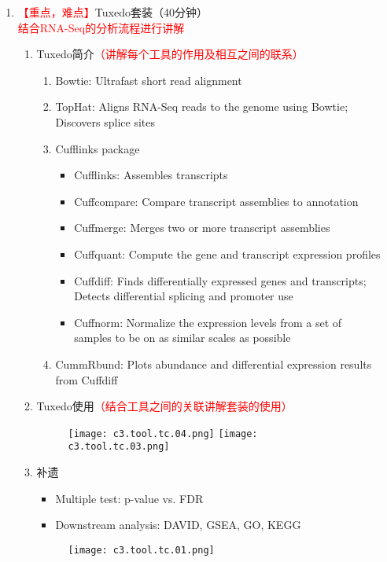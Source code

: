 \documentclass{TIJMUjiaoanLL}
\begin{document}
\begin{enumerate}
  \item \textcolor{red}{【重点，难点】}Tuxedo套装（40分钟）
    \\ \textcolor{red}{结合RNA-Seq的分析流程进行讲解}
    \begin{enumerate}
      \item Tuxedo简介\textcolor{red}{（讲解每个工具的作用及相互之间的联系）}
        \begin{enumerate}
          \item Bowtie: Ultrafast short read alignment
          \item TopHat: Aligns RNA-Seq reads to the genome using Bowtie; Discovers splice sites
          \item Cufflinks package
            \begin{itemize}
              \item Cufflinks: Assembles transcripts
              \item Cuffcompare: Compare transcript assemblies to annotation
              \item Cuffmerge: Merges two or more transcript assemblies
              \item Cuffquant: Compute the gene and transcript expression profiles
              \item Cuffdiff: Finds differentially expressed genes and transcripts;\\ Detects differential splicing and promoter use
              \item Cuffnorm: Normalize the expression levels from a set of\\ samples to be on as similar scales as possible
            \end{itemize}
          \item CummRbund: Plots abundance and differential expression results from Cuffdiff
        \end{enumerate}
      \item Tuxedo使用\textcolor{red}{（结合工具之间的关联讲解套装的使用）}
        \begin{figure}[h]
          \centering
          \texttt{[image: c3.tool.tc.04.png]}
          \texttt{[image: c3.tool.tc.03.png]}
        \end{figure}

\otherTail
\newpage
\otherHeader

      \item 补遗
        \begin{itemize}
          \item Multiple test: p-value vs. FDR
          \item Downstream analysis: DAVID, GSEA, GO, KEGG
        \end{itemize}
        \begin{figure}[h]
          \centering
          \texttt{[image: c3.tool.tc.01.png]}
        \end{figure}
    \end{enumerate}


\end{enumerate}
\end{document}

